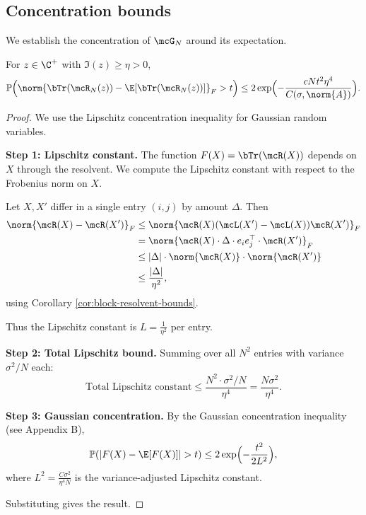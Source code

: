 \subsection{Concentration bounds}

We establish the concentration of $\mcG_N$ around its expectation.

\begin{lemma}\label{lem:concentration}
For $z \in \C^+$ with $\Im(z) \geq \eta > 0$,
\[
\mathbb{P}\Bigl(\norm{\bTr(\mcR_N(z)) - \E[\bTr(\mcR_N(z))]}_F > t\Bigr) \leq 2 \exp\Bigl(-\frac{cNt^2\eta^4}{C(\sigma, \norm{A})}\Bigr).
\]
\end{lemma}

\begin{proof}
We use the Lipschitz concentration inequality for Gaussian random variables.

\textbf{Step 1: Lipschitz constant.} The function $F(X) = \bTr(\mcR(X))$ depends on $X$ through the resolvent. We compute the Lipschitz constant with respect to the Frobenius norm on $X$.

Let $X, X'$ differ in a single entry $(i, j)$ by amount $\Delta$. Then
\begin{align}
\norm{\mcR(X) - \mcR(X')}_F
&\leq \norm{\mcR(X)(\mcL(X') - \mcL(X))\mcR(X')}_F \\
&= \norm{\mcR(X) \cdot \Delta \cdot e_i e_j^\top \cdot \mcR(X')}_F \\
&\leq |\Delta| \cdot \norm{\mcR(X)} \cdot \norm{\mcR(X')} \\
&\leq \frac{|\Delta|}{\eta^2},
\end{align}
using Corollary \ref{cor:block-resolvent-bounds}.

Thus the Lipschitz constant is $L = \frac{1}{\eta^2}$ per entry.

\textbf{Step 2: Total Lipschitz bound.} Summing over all $N^2$ entries with variance $\sigma^2/N$ each:
\[
\text{Total Lipschitz constant} \leq \frac{N^2 \cdot \sigma^2/N}{\eta^4} = \frac{N\sigma^2}{\eta^4}.
\]

\textbf{Step 3: Gaussian concentration.} By the Gaussian concentration inequality (see Appendix B),
\[
\mathbb{P}(|F(X) - \E[F(X)]| > t) \leq 2\exp\Bigl(-\frac{t^2}{2L^2}\Bigr),
\]
where $L^2 = \frac{C \sigma^2}{\eta^4 N}$ is the variance-adjusted Lipschitz constant.

Substituting gives the result.
\end{proof}

